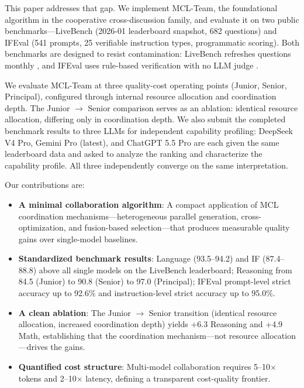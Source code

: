 \documentclass[
]{article}
\providecommand{\tightlist}{%
  \setlength{\itemsep}{0pt}\setlength{\parskip}{0pt}}
\begin{document}
This paper addresses that gap. We implement MCL-Team, the foundational algorithm in the cooperative cross-discussion family, and evaluate it on two public benchmarks---LiveBench (2026-01 leaderboard snapshot, 682 questions) and IFEval (541 prompts, 25 verifiable instruction types, programmatic scoring). Both benchmarks are designed to resist contamination: LiveBench refreshes questions monthly \cite{White2024LiveBench}, and IFEval uses rule-based verification with no LLM judge \cite{Zhou2024IFEval}.

We evaluate MCL-Team at three quality-cost operating points (Junior, Senior, Principal), configured through internal resource allocation and coordination depth. The Junior $\rightarrow$ Senior comparison serves as an ablation: identical resource allocation, differing only in coordination depth. We also submit the completed benchmark results to three LLMs for independent capability profiling: DeepSeek V4 Pro, Gemini Pro (latest), and ChatGPT 5.5 Pro are each given the same leaderboard data and asked to analyze the ranking and characterize the capability profile. All three independently converge on the same interpretation.

Our contributions are:

\begin{itemize}
\tightlist
\item
  \textbf{A minimal collaboration algorithm}: A compact application of MCL coordination mechanisms---heterogeneous parallel generation, cross-optimization, and fusion-based selection---that produces measurable quality gains over single-model baselines.
\item
  \textbf{Standardized benchmark results}: Language (93.5--94.2) and IF (87.4--88.8) above all single models on the LiveBench leaderboard; Reasoning from 84.5 (Junior) to 90.8 (Senior) to 97.0 (Principal); IFEval prompt-level strict accuracy up to 92.6\% and instruction-level strict accuracy up to 95.0\%.
\item
  \textbf{A clean ablation}: The Junior $\rightarrow$ Senior transition (identical resource allocation, increased coordination depth) yields +6.3 Reasoning and +4.9 Math, establishing that the coordination mechanism---not resource allocation---drives the gains.
\item
  \textbf{Quantified cost structure}: Multi-model collaboration requires 5--10$\times$ tokens and 2--10$\times$ latency, defining a transparent cost-quality frontier.
\end{itemize}
\end{document}
